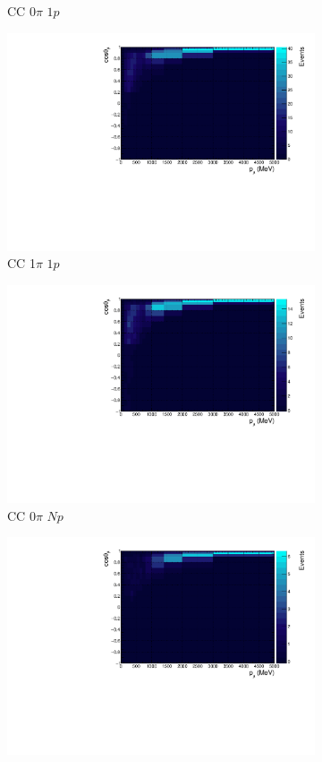 \begin{figure}
\begin{subfigure}{.49\textwidth}
  \caption{CC 0$\pi$ $1p$}
\end{subfigure}
\begin{subfigure}{.49\textwidth}
  \centering
  \includegraphics[width=0.9\linewidth]{figs/nd280_pmtmuu_cc1pi1p.pdf}
  \caption{CC 1$\pi$ $1p$}
\end{subfigure}
\begin{subfigure}{.49\textwidth}
  \centering
  \includegraphics[width=0.9\linewidth]{figs/nd280_pmtmuu_cc0piNp.pdf}
  \caption{CC 0$\pi$ $Np$}
\end{subfigure}
\begin{subfigure}{.49\textwidth}
  \centering
  \includegraphics[width=0.9\linewidth]{figs/nd280_pmtmuu_cc1piNp.pdf}

\end{subfigure}
\end{figure}
